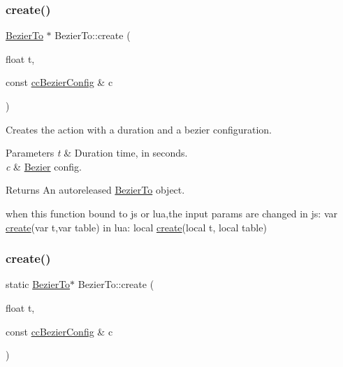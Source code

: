 \subsubsection{\texorpdfstring{create()}{create()}\hspace{0.1cm}{\footnotesize\ttfamily [1/2]}}
{\footnotesize\ttfamily \hyperlink{classBezierTo}{Bezier\+To} $\ast$ Bezier\+To\+::create (\begin{DoxyParamCaption}\item[{float}]{t,  }\item[{const \hyperlink{struct__ccBezierConfig}{cc\+Bezier\+Config} \&}]{c }\end{DoxyParamCaption})\hspace{0.3cm}{\ttfamily [static]}}

Creates the action with a duration and a bezier configuration. 
\begin{DoxyParams}{Parameters}
{\em t} & Duration time, in seconds. \\
\hline
{\em c} & \hyperlink{structBezier}{Bezier} config. \\
\hline
\end{DoxyParams}
\begin{DoxyReturn}{Returns}
An autoreleased \hyperlink{classBezierTo}{Bezier\+To} object. 
\begin{DoxyCode}
when \textcolor{keyword}{this} \textcolor{keyword}{function} bound to js or lua,the input params are changed
in js: var \hyperlink{classBezierTo_ab101906196726dc6cd446999064292ff}{create}(var t,var table)
in lua: local \hyperlink{classBezierTo_ab101906196726dc6cd446999064292ff}{create}(local t, local table)
\end{DoxyCode}
 
\end{DoxyReturn}
\mbox{\label{classBezierTo_abf8120b922511304e03e05b9589adc2f}} 
\subsubsection{\texorpdfstring{create()}{create()}\hspace{0.1cm}{\footnotesize\ttfamily [2/2]}}
{\footnotesize\ttfamily static \hyperlink{classBezierTo}{Bezier\+To}$\ast$ Bezier\+To\+::create (\begin{DoxyParamCaption}\item[{float}]{t,  }\item[{const \hyperlink{struct__ccBezierConfig}{cc\+Bezier\+Config} \&}]{c }\end{DoxyParamCaption})\hspace{0.3cm}{\ttfamily [static]}}

